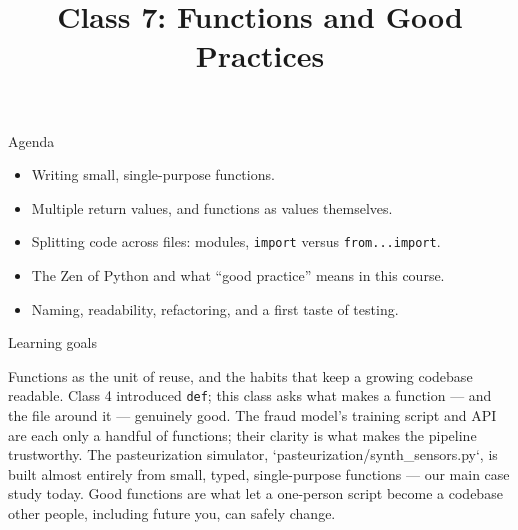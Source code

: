 

\title{Class 7: Functions and Good Practices}
\author{\coursename}
\date{}



\frame{\titlepage \coursefooter}

\begin{frame}{Agenda}
\begin{itemize}
\item Writing small, single-purpose functions.
\item Multiple return values, and functions as values themselves.
\item Splitting code across files: modules, \texttt{import} versus \texttt{from...import}.
\item The Zen of Python and what ``good practice'' means in this course.
\item Naming, readability, refactoring, and a first taste of testing.
\end{itemize}
\coursefooter
\end{frame}

\begin{frame}{Learning goals}
\coursefooter
\end{frame}

\coursecontextframe
{Functions as the unit of reuse, and the habits that keep a growing codebase readable.}
{Class 4 introduced \texttt{def}; this class asks what makes a function --- and the file around it --- genuinely good.}
{The fraud model's training script and API are each only a handful of functions; their clarity is what makes the pipeline trustworthy.}
{The pasteurization simulator, `pasteurization/synth\_sensors.py`, is built almost entirely from small, typed, single-purpose functions --- our main case study today.}
{Good functions are what let a one-person script become a codebase other people, including future you, can safely change.}

